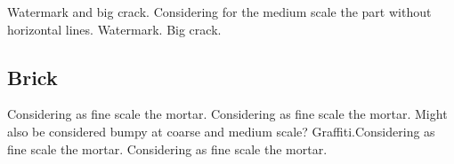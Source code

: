 \documentclass[12pt,a4paper]{article}
\begin{document}
\begin{singlespace}
\renewcommand{\Number}{01}\InputImage{\sfl}{\tco}{\sexdi}{\tsc}{\sexor}{\tsc}
{}{}
\renewcommand{\Number}{02}\InputImage{\sfl}{\tco}{\sfl}{\tco}{\sexdi}{\tsc}
{}{}
\renewcommand{\Number}{03}\InputImage{\sfl}{\tco}{\sexor}{\tsc}{\sexor}{\tsc}
{}{}
\renewcommand{\Number}{04}\InputImage{\sfl}{\tco}{\sexor}{\tsc}{\sro}{\tco}
{Watermark and big crack.}{}
\renewcommand{\Number}{05}\InputImage{\sfl}{\tco}{\sfl}{\tco}{\sexor}{\tsc}
{}{Considering for the medium scale the part without horizontal lines.}
\renewcommand{\Number}{06}\InputImage{\sfl}{\tco}{\sexor}{\tsc}{\sexor}{\tsc}
{}{}
\renewcommand{\Number}{07}\InputImage{\sfl}{\tco}{\sexor}{\tco}{\sexor}{\tco}
{}{}
\renewcommand{\Number}{08}\InputImage{\sfl}{\tco}{\sexor}{\tsc}{\sexor}{\tsc}
{Watermark.}{}
\renewcommand{\Number}{09}\InputImage{\sfl}{\tco}{\sexor}{\tsc}{\sexdi}{\tsc}
{}{}
\renewcommand{\Number}{10}\InputImage{\sfl}{\tco}{\sexor}{\tsc}{\sexor}{\tsc}
{}{}
\renewcommand{\Number}{11}\InputImage{\sfl}{\tco}{\sexor}{\tsc}{\sro}{\tsc}
{Big crack.}{}
\renewcommand{\Number}{12}\InputImage{\sfl}{\tco}{\sexor}{\tsc}{\sexor}{\tsc}
{}{}

\clearpage
\renewcommand{\mat}{Brick}
\subsection{\mat}

\renewcommand{\Number}{01}\InputImage{\sfl}{\tco}{\sexor}{\tco}{\sexor}{\tco}
{}{}
\renewcommand{\Number}{02}\InputImage{\sfl}{\tsc}{\sexor}{\tco}{\sexor}{\tco}
{}{Considering as fine scale the mortar.}
\renewcommand{\Number}{03}\InputImage{\sfl}{\tsc}{\sfl}{\tco}{\sexor}{\tsc}
{}{Considering as fine scale the mortar.}
\renewcommand{\Number}{04}\InputImage{\sfl}{\tco}{\sexor}{\tco}{\sexor}{\tco}
{}{}
\renewcommand{\Number}{05}\InputImage{\sfl}{\tco}{\sexor}{\tco}{\sexor}{\tco}
{}{Might also be considered bumpy at coarse and medium scale?}
\renewcommand{\Number}{06}\InputImage{\sfl}{\tco}{\sexor}{\tsm}{\sexor}{\tsm}
{Graffiti.}{Considering as fine scale the mortar.}
\renewcommand{\Number}{07}\InputImage{\sfl}{\tco}{\sexor}{\tco}{\sexor}{\tco}
{}{}
\renewcommand{\Number}{08}\InputImage{\sfl}{\tco}{\sexor}{\tbu}{\sexor}{\tbu}
{}{}
\renewcommand{\Number}{09}\InputImage{\sfl}{\tco}{\sexor}{\tco}{\sexor}{\tco}
{}{}
\renewcommand{\Number}{10}\InputImage{\sfl}{\tsc}{\sexor}{\tco}{\sexor}{\tco}
{}{Considering as fine scale the mortar.}
\renewcommand{\Number}{11}\InputImage{\sexor}{\tco}{\sexor}{\tco}{\sexor}{\tco}
{}{}
\renewcommand{\Number}{12}\InputImage{\sfl}{\tsm}{\sexor}{\tsm}{\sexor}{\tbu}
{}{}


\end{singlespace}
\end{document}
